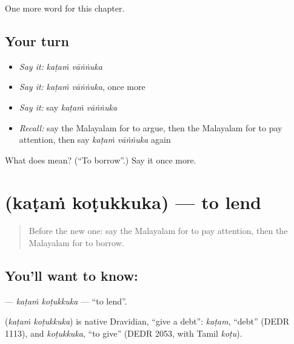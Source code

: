 \begin{grammarlens}[title={What you've built}]
One more word for this chapter.
\end{grammarlens}

\subsection*{Your turn}
\begin{itemize}
\raggedright
  \item \emph{Say it:} \emph{kaṭaṁ vāṅṅuka}
  \item \emph{Say it:} \emph{kaṭaṁ vāṅṅuka}, once more
  \item \emph{Say it:} say \emph{kaṭaṁ vāṅṅuka}
  \item \emph{Recall:} say the Malayalam for to argue, then the Malayalam for to pay attention, then say \emph{kaṭaṁ vāṅṅuka} again
\end{itemize}

\begin{tcolorbox}[breakable,colback=teal!4,colframe=teal!35!black,title={Before you move on}]
What does   mean? (\textquotedblleft{}To borrow\textquotedblright{}.) Say it once more.
\end{tcolorbox}
\section[\texorpdfstring{\ml{കടം} \ml{കൊടുക്കുക} (kaṭaṁ koṭukkuka)}{കടം കൊടുക്കുക (kaṭaṁ koṭukkuka)}]{  (kaṭaṁ koṭukkuka) — to lend}

\label{lesson:ML-C271-katam-kotukkuka}



\begin{quote}
Before the new one: say the Malayalam for to pay attention, then the Malayalam for to borrow.
\end{quote}

\subsection*{You'll want to know:  }
\textbf{ } — \emph{kaṭaṁ koṭukkuka} — \textquotedblleft{}to lend\textquotedblright{}.

\begin{cousinweb}
\textbf{ } (\emph{kaṭaṁ koṭukkuka}) is native Dravidian, \textquotedblleft{}give a debt\textquotedblright{}: \emph{kaṭam}, \textquotedblleft{}debt\textquotedblright{} (DEDR 1113), and \emph{koṭukkuka}, \textquotedblleft{}to give\textquotedblright{} (DEDR 2053, with Tamil \emph{koṭu}).
\end{cousinweb}


